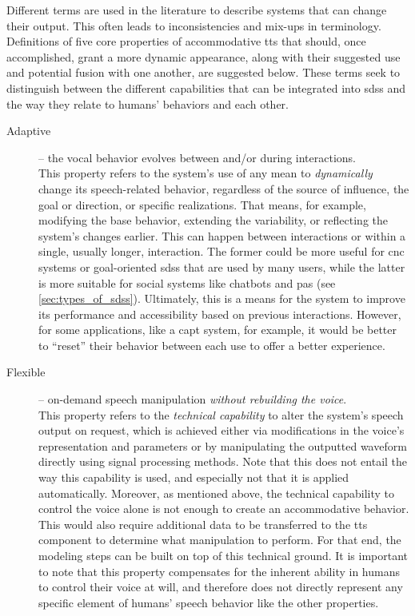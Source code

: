 Different terms are used in the literature to describe systems that can change their output.
This often leads to inconsistencies and mix-ups in terminology.
Definitions of five core properties of accommodative \ac{tts} that should, once accomplished, grant a more dynamic appearance, along with their suggested use and potential fusion with one another, are suggested below.
These terms seek to distinguish between the different capabilities that can be integrated into \acp{sds} and the way they relate to humans’ behaviors and each other.
%
\begin{description}
	\item[Adaptive] -- the vocal behavior evolves between and/or during interactions.\\
	This property refers to the system's use of any mean to \emph{dynamically} change its speech-related behavior, regardless of the source of influence, the goal or direction, or specific realizations.
	That means, for example, modifying the base behavior, extending the variability, or reflecting the system's changes earlier.
	This can happen between interactions or within a single, usually longer, interaction.
	The former could be more useful for \ac{cnc} systems or goal-oriented \acp{sds} that are used by many users, while the latter is more suitable for social systems like chatbots and \acp{pa} (see \cref{sec:types_of_sdss}).
	Ultimately, this is a means for the system to improve its performance and accessibility based on previous interactions.
	However, for some applications, like a \ac{capt} system, for example, it would be better to \enquote{reset} their behavior between each use to offer a better experience.

	\item[Flexible] -- on-demand speech manipulation \emph{without rebuilding the voice}.\\
	This property refers to the \emph{technical capability} to alter the system's speech output on request, which is achieved either via modifications in the voice's representation and parameters or by manipulating the outputted waveform directly using signal processing methods.
	Note that this does not entail the way this capability is used, and especially not that it is applied automatically.
	Moreover, as mentioned above, the technical capability to control the voice alone is not enough to create an accommodative behavior.
	This would also require additional data to be transferred to the \ac{tts} component to determine what manipulation to perform.
	For that end, the modeling steps can be built on top of this technical ground.
	It is important to note that this property compensates for the inherent ability in humans to control their voice at will, and therefore does not directly represent any specific element of humans' speech behavior like the other properties.
	

\end{description}
